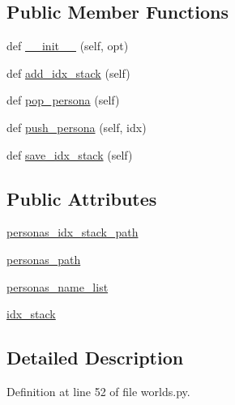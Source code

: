 \subsection*{Public Member Functions}
\begin{DoxyCompactItemize}
\item 
def \hyperlink{classpersonachat__eval_1_1worlds_1_1PersonasGenerator_a1040c1f204e103d16f0a8137c1dec671}{\+\_\+\+\_\+init\+\_\+\+\_\+} (self, opt)
\item 
def \hyperlink{classpersonachat__eval_1_1worlds_1_1PersonasGenerator_a3ee1d0c2545efba647539933d1d649d0}{add\+\_\+idx\+\_\+stack} (self)
\item 
def \hyperlink{classpersonachat__eval_1_1worlds_1_1PersonasGenerator_ac73e52e318d64155bf0812768f0e3fa3}{pop\+\_\+persona} (self)
\item 
def \hyperlink{classpersonachat__eval_1_1worlds_1_1PersonasGenerator_add94526a589a3e01f2843f88e31b754e}{push\+\_\+persona} (self, idx)
\item 
def \hyperlink{classpersonachat__eval_1_1worlds_1_1PersonasGenerator_ae6b7fbf4c1ec66c73f69de4df0357447}{save\+\_\+idx\+\_\+stack} (self)
\end{DoxyCompactItemize}
\subsection*{Public Attributes}
\begin{DoxyCompactItemize}
\item 
\hyperlink{classpersonachat__eval_1_1worlds_1_1PersonasGenerator_a9f5f33e98c5ca888b345a0adfb799fe7}{personas\+\_\+idx\+\_\+stack\+\_\+path}
\item 
\hyperlink{classpersonachat__eval_1_1worlds_1_1PersonasGenerator_a8d78d1748f246ca5a3313dd0719772b2}{personas\+\_\+path}
\item 
\hyperlink{classpersonachat__eval_1_1worlds_1_1PersonasGenerator_a93f6fd5e10e1fadb6f4494d223978992}{personas\+\_\+name\+\_\+list}
\item 
\hyperlink{classpersonachat__eval_1_1worlds_1_1PersonasGenerator_a0065bfc8c429bc99b4c180315a2a33dd}{idx\+\_\+stack}
\end{DoxyCompactItemize}


\subsection{Detailed Description}


Definition at line 52 of file worlds.\+py.



